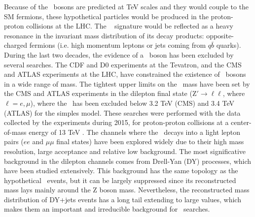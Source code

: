 Because of the \Zprime~bosons are predicted at TeV scales and they would couple to the SM fermions, 
these hypothetical particles would be produced in the proton-proton collisions at the LHC. The \Zprime~ 
signature would be reflected as a heavy resonance in the invariant mass distribution of its 
decay products: opposite-charged fermions (i.e. high momentum leptons or jets coming from $q\bar{b}$ quarks). During 
the last two decades, the evidence of a \Zprime~boson has been excluded by several searches. 
The CDF\cite{CDFZprimedielectronbib,CDFZprimedimuonbib,CDFZprimeditaubib,CDFZprimeditopbib}  
and D0\cite{D0Zprimesearchesbib,D0Zprimetodielectronbib,D0Zprimeditopbib} experiments at the Tevatron, and
the CMS\cite{CMSZprime2dileptonbib,CMSZprime2ditaubib,CMSZprime2tausRunII,CMSZprime2ditauelectronmuonbib,CMSZprime2toptop,CMSZprime2bbbib,CMSZprime2dijetbib}
and ATLAS \cite{ATLASZprime2dileptonbib,ATLASZprime2ditaubib,ATLASZprime2toptopbib, ATLAS_Zprime2tausRunII} experiments at the LHC, have 
constrained the existence of \Zprime~bosons in a wide range of mass. The tightest 
upper limits on the \Zprime~mass have been set by the CMS and ATLAS experiments in the dilepton final 
state (Z$'\rightarrow \ell\ell$, where $\ell=e, \mu$), where the \Zprime~has been excluded below 3.2 TeV (CMS) and 3.4 TeV (ATLAS)
for the simples model. These searches were performed with the data collected by the experiments during 2015, for proton-proton 
collisions at a center-of-mass energy of 13 TeV \cite{CMSZprime2dileptonbib,ATLASZprime2dileptonbib}. The channels
where the \Zprime~decays into a light lepton pairs ($ee$ and $\mu\mu$ final states) have been explored
widely due to their high mass resolution, large acceptance and relative low background. The most significative 
background in the dilepton channels comes from Drell-Yan (DY) processes, which have been studied extensively. This 
background has the same topology as the hypothetical \Zprime~events, but it can be largely 
suppressed since its reconstructed mass lays mainly around the Z boson mass. Nevertheless, the 
reconstructed mass distribution of DY+jets events has a long tail extending to large values, which 
makes them an important and irreducible background for \Zprime~searches.  \\

